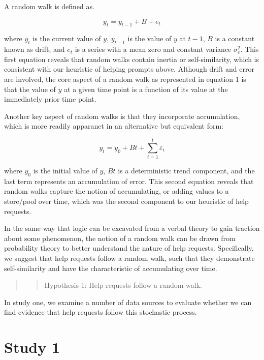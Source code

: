 \documentclass[english,,man]{apa6}
\theoremstyle{definition}
\theoremstyle{definition}
\theoremstyle{definition}
\theoremstyle{remark}
\begin{document}
A random walk is defined as.

\begin{equation}
y_{t} = y_{t-1} + B + e_{t}
\end{equation}

where \(y_{t}\) is the current value of \(y\), \(y_{t-1}\) is the value
of \(y\) at \(t - 1\), \(B\) is a constant known as drift, and \(e_{t}\)
is a series with a mean zero and constant variance \(\sigma^2_{e}\).
This first equation reveals that random walks contain inertia or
self-similarity, which is consistent with our heuristic of helping
prompts above. Although drift and error are involved, the core aspect of
a random walk as represented in equation 1 is that the value of \(y\) at
a given time point is a function of its value at the immediately prior
time point.

Another key aspect of random walks is that they incorporate
accumulation, which is more readily apparanet in an alternative but
equivalent form:

\begin{equation}
y_{t} = y_{0} + Bt + \sum_{i = 1}^{t} \varepsilon_i
\end{equation}

where \(y_{0}\) is the initial value of \(y\), \(Bt\) is a deterministic
trend component, and the last term represents an accumulation of error.
This second equation reveals that random walks capture the notion of
accumulating, or adding values to a store/pool over time, which was the
second component to our heuristic of help requests.

In the same way that logic can be excavated from a verbal theory to gain
traction about some phenomenon, the notion of a random walk can be drawn
from probability theory to better understand the nature of help
requests. Specifically, we suggest that help requests follow a random
walk, such that they demonstrate self-similarity and have the
characteristic of accumulating over time.

\begin{quote}
\begin{quote}
Hypothesis 1: Help requests follow a random walk.
\end{quote}
\end{quote}

In study one, we examine a number of data sources to evaluate whether we
can find evidence that help requests follow this stochastic process.

\hypertarget{study-1}{%
\section{Study 1}\label{study-1}}
\end{document}
